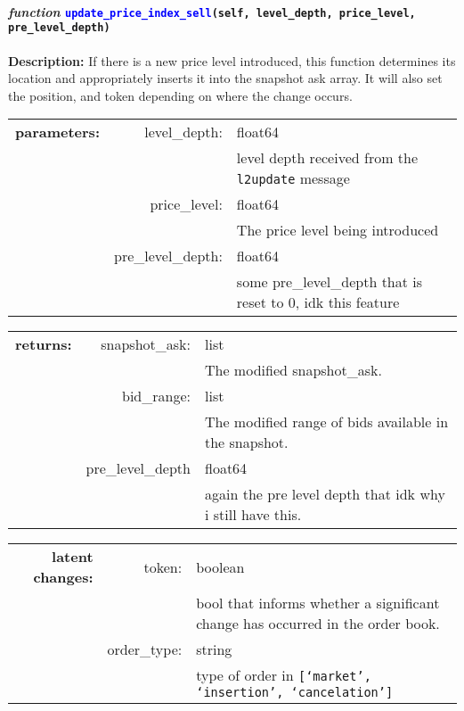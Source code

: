 
\paragraph{\textit{function} \textcolor{blue}{\texttt{update\_price\_index\_sell}}\texttt{(self, level\_depth, price\_level, pre\_level\_depth)}}\hfill\break
\noindent \textbf{Description:} If there is a new price level introduced, this function determines its location and appropriately inserts it into the snapshot ask array. It will also set the position, and token depending on where the change occurs. 

\begin{tabular}{r r l }
	\textbf{parameters:}	& level\_depth: & float64\\
	&  & level depth received from the \texttt{l2update} message\\
	& price\_level:& float64\\
	&& The price level being introduced\\
	& pre\_level\_depth:& float64\\
	&& some pre\_level\_depth that is reset to 0, idk this feature
\end{tabular}

\begin{tabular}{r r l}
	\textbf{returns:} & snapshot\_ask: & list\\
	& & The modified snapshot\_ask.\\
	& bid\_range: & list \\
	&& The modified range of bids available in the snapshot.\\
	&pre\_level\_depth &float64\\
	&& again the pre level depth that idk why i still have this.\\
\end{tabular}

\begin{tabular}{r r l}
	\textbf{latent changes:} & token: & boolean\\
	& & bool that informs whether a significant change has occurred in the order book. \\
	& order\_type:& string\\
	&& type of order in \texttt{[`market', `insertion', `cancelation']}\\
	
\end{tabular}


